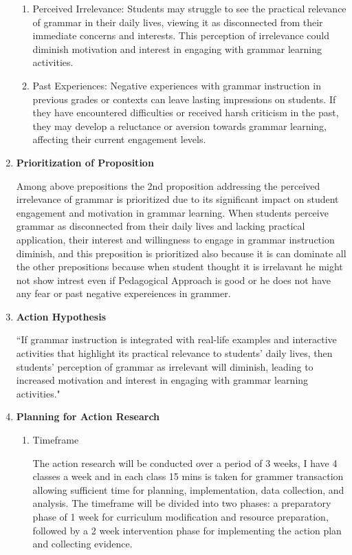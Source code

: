 \documentclass[12pt, a4paaper]{article}
\begin{document}
\begin{enumerate}
\begin{enumerate}
    \item Perceived Irrelevance: Students may struggle to see the practical relevance of grammar in their daily lives, viewing it as disconnected from their immediate concerns and interests. This perception of irrelevance could diminish motivation and interest in engaging with grammar learning activities.
    \item Past Experiences: Negative experiences with grammar instruction in previous grades or contexts can leave lasting impressions on students. If they have encountered difficulties or received harsh criticism in the past, they may develop a reluctance or aversion towards grammar learning, affecting their current engagement levels.
\end{enumerate}

\item \textbf{Prioritization of Proposition}

Among above prepositions the 2nd  proposition addressing the perceived irrelevance of grammar is prioritized due to its significant impact on student engagement and motivation in grammar learning. When students perceive grammar as disconnected from their daily lives and lacking practical application, their interest and willingness to engage in grammar instruction diminish, and this preposition is prioritized also because it is can dominate all the other prepositions because when student thought it is irrelavant he might not show intrest even if Pedagogical Approach is good or he does not have any fear or past negative expereiences in grammer.

\item \textbf{Action Hypothesis}

``If grammar instruction is integrated with real-life examples and interactive activities that highlight its practical relevance to students' daily lives, then students' perception of grammar as irrelevant will diminish, leading to increased motivation and interest in engaging with grammar learning activities."  

\item \textbf{Planning for Action Research}
\begin{enumerate}

    \item Timeframe
    
The action research will be conducted over a period of 3 weeks, I have 4 classes a week and  in each class 15 mins is taken for grammer transaction allowing sufficient time for planning, implementation, data collection, and analysis. The timeframe will be divided into two phases: a preparatory phase of 1 week for curriculum modification and resource preparation, followed by a 2 week intervention phase for implementing the action plan and collecting evidence.


\end{enumerate}
\end{enumerate}
\end{document}
